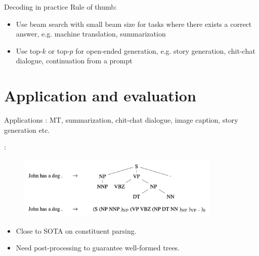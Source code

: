 \documentclass[usenames,dvipsnames,notes]{beamer}
\begin{document}
\begin{frame}
    {Decoding in practice}
    Rule of thumb:\\
    \begin{itemize}
        \item Use beam search with small beam size for tasks where there exists a correct answer, e.g. machine translation, summarization
        \item Use top-$k$ or top-$p$ for open-ended generation, e.g. story generation, chit-chat dialogue, continuation from a prompt
    \end{itemize}
\end{frame}

\section{Application and evaluation}

\begin{frame}
    {Applications}
    : MT, summarization, chit-chat dialogue, image caption, story generation etc.

    :
    \vspace{-1em}
    \begin{figure}
        \includegraphics[height=3cm]{figures/s2s-parsing}
    \end{figure}
    \vspace{-1em}
    \begin{itemize}
        \item Close to SOTA on constituent parsing.
        \item Need post-processing to guarantee well-formed trees.
    \end{itemize}
\end{frame}
\end{document}
